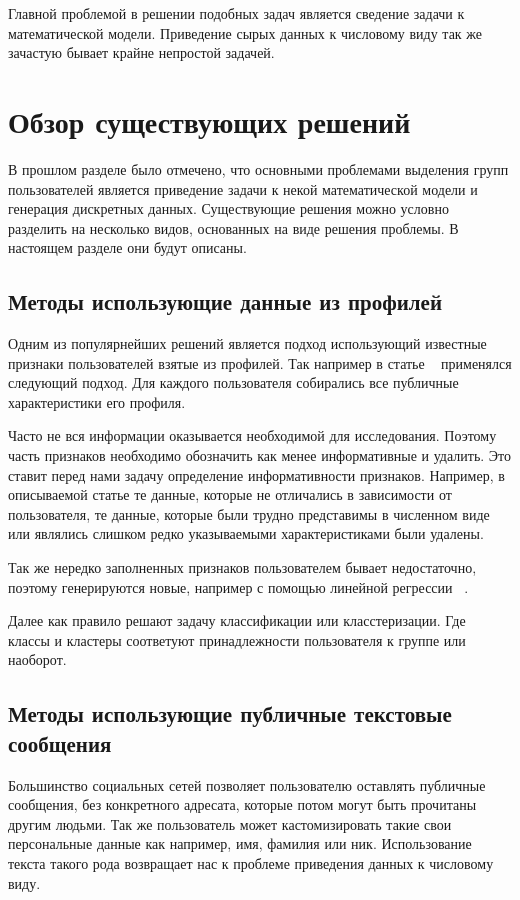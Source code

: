 \documentclass[annotation,times,page4]{itmo-student-thesis}
\begin{document}
Главной проблемой в решении подобных задач является сведение задачи к математической модели. Приведение сырых данных к числовому виду так же зачастую бывает крайне непростой задачей.
  
\section{Обзор существующих решений}
В прошлом разделе было отмечено, что основными проблемами выделения групп пользователей является приведение задачи к некой математической модели и генерация дискретных данных. Существующие решения можно условно разделить на несколько видов, основанных на виде решения проблемы. В настоящем разделе они будут описаны.
\subsection{Методы использующие данные из профилей}
Одним из популярнейших решений является подход использующий известные признаки пользователей взятые из профилей. Так например в статье ~\cite{golbeck2011predicting} применялся следующий подход. Для каждого пользователя собирались все публичные характеристики его профиля. 

Часто не вся информации оказывается необходимой для исследования. Поэтому часть признаков необходимо обозначить как менее информативные и удалить. Это ставит перед нами задачу определение информативности признаков. Например, в описываемой статье те данные, которые не отличались в зависимости от пользователя, те данные, которые были трудно представимы в численном виде или являлись слишком редко указываемыми характеристиками были удалены.
 
Так же нередко заполненных признаков пользователем бывает недостаточно, поэтому генерируются новые, например с помощью линейной регрессии ~\cite{golbeck2011predicting}.

Далее как правило решают задачу классификации или класстеризации. Где классы и кластеры соответуют принадлежности пользователя к группе или наоборот.
\subsection{Методы использующие публичные текстовые сообщения}
Большинство социальных сетей позволяет пользователю оставлять публичные сообщения, без конкретного адресата, которые потом могут быть прочитаны другим людьми. Так же пользователь может кастомизировать такие свои персональные данные как например, имя, фамилия или ник. Использование текста такого рода возвращает нас к проблеме приведения данных к числовому виду.
 
\end{document}
